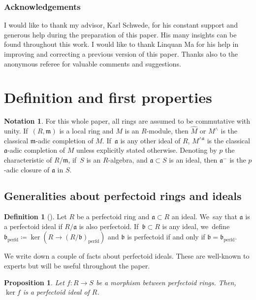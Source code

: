 \documentclass[11pt]{article}
\newcommand{\Subsection}{\subsection}
\theoremstyle{plain}
\newtheorem{proposition}[theorem]{Proposition}
\theoremstyle{definition}
\newtheorem{definition}[theorem]{Definition}
\newtheorem{notation}[theorem]{Notation}
\numberwithin{equation}{theorem}
\newcommand{\fra}{\mathfrak{a}}
\newcommand{\frab}{\mathfrak{b}}
\newcommand{\fram}{\mathfrak{m}}
\newcommand{\perfd}{_{\mathrm{perfd}}}
\begin{document}
\subsubsection*{Acknowledgements}
I would like to thank my advisor, Karl Schwede, for his constant support and generous help during the preparation of this paper. His many insights can be found throughout this work. I would like to thank Linquan Ma for his help in improving and correcting a previous version of this paper. Thanks also to the anonymous referee for valuable comments and suggestions.

\section{Definition and first properties}

\begin{notation}
For this whole paper, all rings are assumed to be commutative with unity. If~$(R,\fram)$ is a local ring and $M$ is an $R$\nobreakdash-module, then $\widehat{M}$ or $M^\wedge$ is the classical $\fram$-adic completion of $M$. If~$\fra$ is any other ideal of $R$, $M^{\wedge \fra}$ is the classical $\fra$-adic completion of $M$ unless explicitly stated otherwise. Denoting by $p$ the characteristic of $R/\fram$, if~$S$ is an $R$\nobreakdash-algebra, and $\fra\subset S$ is an ideal, then $\fra^-$ is the $p$-adic closure of $\fra$ in $S$.
\end{notation}

\Subsection{Generalities about perfectoid rings and ideals}

\begin{definition}[{\cite[\S 10]{BhattScholzePrisms}}]\label{definition perfectoidization}
Let $R$ be a perfectoid ring and $\fra\subset R$ an ideal. We~say that $\fra$ is a perfectoid ideal if $R/\fra$ is also perfectoid. If~$\frab\subset R$ is any ideal, we~define $\frab\perfd\coloneqq \ker(R\to (R/\frab)\perfd)$ and $\frab$ is perfectoid if and only if $\frab=\frab\perfd$.
\end{definition}

We write down a couple of facts about perfectoid ideals. These are well-known to experts but will be useful throughout the paper.

\begin{proposition}\label{kernel of map of perfd rings}
Let $f\colon R\to S$ be a morphism between perfectoid rings. Then, $\ker f$ is a perfectoid ideal of $R$.
\end{proposition}
\end{document}
